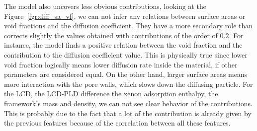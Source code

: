 \documentclass[main]{subfiles}
\begin{document}
The model also uncovers less obvious contributions, looking at the Figure~\ref{fgr:diff_sa_vf}, we can not infer any relations between surface areas or void fractions and the diffusion coefficient. They have a more secondary role than corrects slightly the values obtained with contributions of the order of $0.2$. For instance, the model finds a positive relation between the void fraction and the contribution to the diffusion coefficient value. This is physically true since lower void fraction logically means lower diffusion rate inside the material, if other parameters are considered equal. On the other hand, larger surface areas means more interaction with the pore walls, which slows down the diffusing particle. For the LCD, the LCD-PLD difference the xenon adsorption enthalpy, the framework's mass and density, we can not see clear behavior of the contributions. This is probably due to the fact that a lot of the contribution is already given by the previous features because of the correlation between all these features. 
\end{document}
